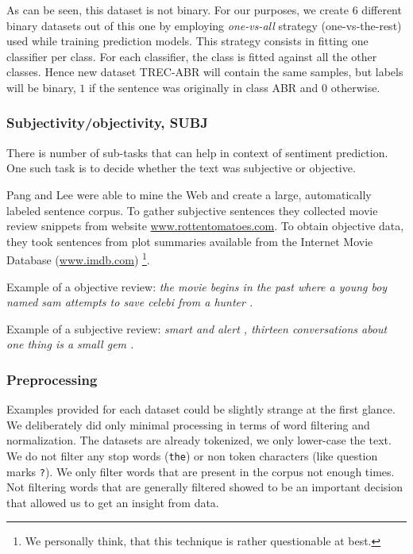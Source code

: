     As can be seen, this dataset is not binary. 
    For our purposes, we create $6$ different binary datasets out of this one by employing \emph{one-vs-all} strategy (one-vs-the-rest) used while training prediction models.
    This strategy consists in fitting one classifier per class. 
    For each classifier, the class is fitted against all the other classes. 
    Hence new dataset TREC-ABR will contain the same samples, but labels will be binary, $1$ if the sentence was originally in class ABR and $0$ otherwise.
    
    \* %


    \subsubsection{Subjectivity/objectivity, SUBJ}
    
    There is number of sub-tasks that can help in context of sentiment prediction.
    One such task is to decide whether the text was subjective or objective.
        
    Pang and Lee were able to mine the Web and create a large, automatically labeled sentence corpus. 
    To gather subjective sentences they collected movie review snippets from website  \url{www.rottentomatoes.com}.
    To obtain objective data, they took sentences from plot summaries available from the Internet Movie Database (\url{www.imdb.com}) \cite{pang2004sentimental} \footnote{We personally think, that this technique is rather questionable at best.}.
    
    Example of a objective review:
    \emph{the movie begins in the past where a young boy named sam attempts to save celebi from a hunter .}

    Example of a subjective review:
    \emph{smart and alert , thirteen conversations about one thing is a small gem .}
    

    \subsubsection{Preprocessing} \label{sec:preprocessing}
    
    Examples provided for each dataset could be slightly strange at the first glance.
    We deliberately did only minimal processing in terms of word filtering and normalization.
    The datasets are already tokenized, we only lower-case the text.
    We do not filter any stop words (\texttt{the}) or non token characters (like question marks \texttt{?}). 
    We only filter words that are present in the corpus not enough times. \* %
    Not filtering words that are generally filtered showed to be an important decision that allowed us to get an insight from data.
    
